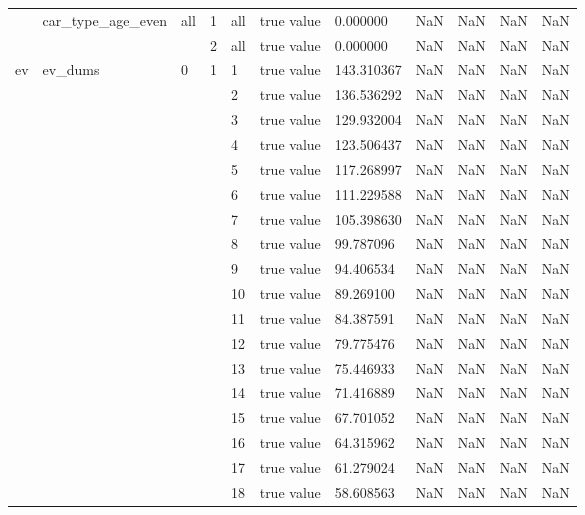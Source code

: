 \begin{tabular}{lllllllrrrr}
\cline{2-11} \cline{3-11} \cline{4-11} \cline{5-11}
 & \multirow[t]{2}{*}{car_type_age_even} & \multirow[t]{2}{*}{all} & 1 & all & true value & 0.000000 & NaN & NaN & NaN & NaN \\
\cline{4-11} \cline{5-11}
 &  &  & 2 & all & true value & 0.000000 & NaN & NaN & NaN & NaN \\
\cline{1-11} \cline{2-11} \cline{3-11} \cline{4-11} \cline{5-11}
\multirow[t]{51}{*}{ev} & \multirow[t]{51}{*}{ev_dums} & \multirow[t]{51}{*}{0} & \multirow[t]{25}{*}{1} & 1 & true value & 143.310367 & NaN & NaN & NaN & NaN \\
\cline{5-11}
 &  &  &  & 2 & true value & 136.536292 & NaN & NaN & NaN & NaN \\
\cline{5-11}
 &  &  &  & 3 & true value & 129.932004 & NaN & NaN & NaN & NaN \\
\cline{5-11}
 &  &  &  & 4 & true value & 123.506437 & NaN & NaN & NaN & NaN \\
\cline{5-11}
 &  &  &  & 5 & true value & 117.268997 & NaN & NaN & NaN & NaN \\
\cline{5-11}
 &  &  &  & 6 & true value & 111.229588 & NaN & NaN & NaN & NaN \\
\cline{5-11}
 &  &  &  & 7 & true value & 105.398630 & NaN & NaN & NaN & NaN \\
\cline{5-11}
 &  &  &  & 8 & true value & 99.787096 & NaN & NaN & NaN & NaN \\
\cline{5-11}
 &  &  &  & 9 & true value & 94.406534 & NaN & NaN & NaN & NaN \\
\cline{5-11}
 &  &  &  & 10 & true value & 89.269100 & NaN & NaN & NaN & NaN \\
\cline{5-11}
 &  &  &  & 11 & true value & 84.387591 & NaN & NaN & NaN & NaN \\
\cline{5-11}
 &  &  &  & 12 & true value & 79.775476 & NaN & NaN & NaN & NaN \\
\cline{5-11}
 &  &  &  & 13 & true value & 75.446933 & NaN & NaN & NaN & NaN \\
\cline{5-11}
 &  &  &  & 14 & true value & 71.416889 & NaN & NaN & NaN & NaN \\
\cline{5-11}
 &  &  &  & 15 & true value & 67.701052 & NaN & NaN & NaN & NaN \\
\cline{5-11}
 &  &  &  & 16 & true value & 64.315962 & NaN & NaN & NaN & NaN \\
\cline{5-11}
 &  &  &  & 17 & true value & 61.279024 & NaN & NaN & NaN & NaN \\
\cline{5-11}
 &  &  &  & 18 & true value & 58.608563 & NaN & NaN & NaN & NaN \\

\end{tabular}
